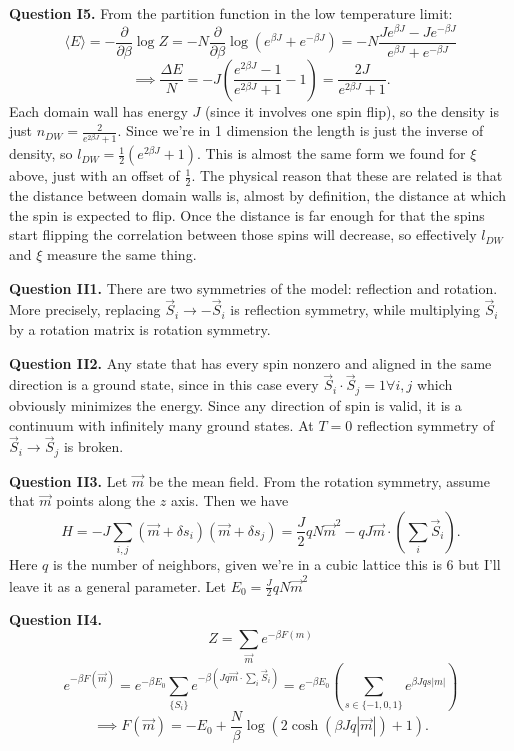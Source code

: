 \documentclass[letterpaper, reqno,11pt]{article}
\begin{document}
{\medskip\noindent\bf Question I5.} From the partition function in the low temperature limit:
\[
\langle E \rangle =- \frac{\partial}{\partial\beta}\log Z=-N\frac{\partial}{\partial\beta}\log\left( e^{\beta J}+e^{-\beta J} \right)=-N \frac{Je^{\beta J}-Je^{-\beta J}}{e^{\beta J}+e^{-\beta J}}
\]
\[
\implies \frac{\Delta E}{N}= -J\left(\frac{e^{2\beta J}-1}{e^{2\beta J}+1}-1\right)= \frac{2J}{e^{2\beta J}+1}
.\]
Each domain wall has energy $J$ (since it involves one spin flip), so the density is just $n_{DW}= \frac{2}{e^{2\beta J}+1}$. Since we're in 1 dimension the length is just the inverse of density, so $l_{DW}=\frac{1}{2}\left( e^{2\beta J}+1 \right) $. This is almost the same form we found for $\xi$ above, just with an offset of $\frac{1}{2}$. The physical reason that these are related is that the distance between domain walls is, almost by definition, the distance at which the spin is expected to flip. Once the distance is far enough for that the spins start flipping the correlation between those spins will decrease, so effectively $l_{DW}$ and $\xi$ measure the same thing.

\newpage

{\medskip\noindent\bf Question II1.} There are two symmetries of the model: reflection and rotation. More precisely, replacing $\vec S_i\to -\vec S_i$ is reflection symmetry, while multiplying $\vec S_i$ by a rotation matrix is rotation symmetry.

{\medskip\noindent\bf Question II2.} Any state that has every spin nonzero and aligned in the same direction is a ground state, since in this case every $\vec S_i\cdot\vec S_j=1\forall i,j$ which obviously minimizes the energy. Since any direction of spin is valid, it is a continuum with infinitely many ground states. At $T=0$ reflection symmetry of $\vec S_i\to \vec S_j$ is broken.

{\medskip\noindent\bf Question II3.} Let $\vec m$ be the mean field. From the rotation symmetry, assume that $\vec m$ points along the $z$ axis. Then we have
\[
H=-J\sum_{i,j}\left( \vec m+\delta s_i \right) \left( \vec m+\delta s_j \right) =\frac{J}{2}qN\vec m^2-qJ\vec m\cdot \left( \sum_{i}\vec S_i \right) 
.\]
Here $q$ is the number of neighbors, given we're in a cubic lattice this is 6 but I'll leave it as a general parameter. Let $E_0=\frac{J}{2}qN\vec m^2$

{\medskip\noindent\bf Question II4.} 
\[
Z=\sum_{\vec m}e^{-\beta F(m)}
\]
\[
e^{-\beta F(\vec m)}=e^{-\beta E_0}\sum_{\{S_i\}}e^{-\beta\left(Jq\vec m\cdot \sum_{i}\vec S_i \right) }=e^{-\beta E_0}\left( \sum_{s\in \{-1, 0, 1\}}e^{\beta Jqs|m|} \right) 
\]
\[
\implies F(\vec m)=-E_0+\frac{N}{\beta}\log \left( 2\cosh\left( \beta Jq|\vec m| \right) +1 \right) 
.\]
\end{document}
